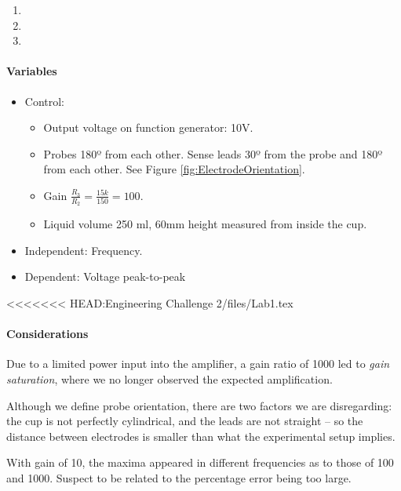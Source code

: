 \begin{enumerate}
	\item 
	\item 
	\item 
\end{enumerate}
\paragraph{Variables}
\begin{itemize}
	\item Control:
		\begin{itemize}
			\item Output voltage on function generator: 10V.
			\item Probes 180º from each other. Sense leads 30º from the probe and 180º from each other. See Figure \ref{fig:ElectrodeOrientation}.
			\item Gain $\frac{R_3}{R_2} = \frac{15k}{150} = 100$.
			\item Liquid volume 250 ml, 60mm height measured from inside the cup.
		\end{itemize}
	\item Independent: Frequency.
	\item Dependent: Voltage peak-to-peak
\end{itemize}

<<<<<<< HEAD:Engineering Challenge 2/files/Lab1.tex
\paragraph{Considerations}

Due to a limited power input into the amplifier, a gain ratio of 1000 led to \textit{gain saturation}, where we no longer observed the expected amplification.

Although we define probe orientation, there are two factors we are disregarding: the cup is not perfectly cylindrical, and the leads are not straight -- so the distance between electrodes is smaller than what the experimental setup implies.

With gain of 10, the maxima appeared in different frequencies as to those of 100 and 1000. Suspect to be related to the percentage error being too large.

